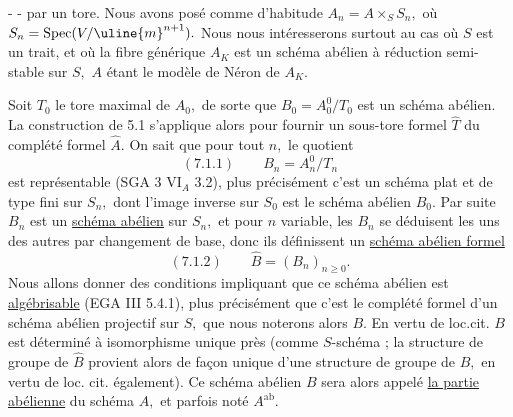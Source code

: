 -  -
par un tore. Nous avons posé comme d'habitude \(A_n=A\times_S S_n,\) où \(S_n=\operatorname{Spec}(V/\uline{m}^{n+1}).\) Nous nous intéresserons surtout au cas où \(S\) est un trait, et où la fibre générique \(A_K\) est un schéma abélien à réduction semi-stable sur \(S,\) \(A\) étant le modèle de Néron de \(A_K.\)

Soit \(T_0\) le tore maximal de \(A_0,\) de sorte que \(B_0=A_0^0/T_0\) est un schéma abélien. La construction de 5.1 s'applique alors pour fournir un sous-tore formel \(\hat T\) du complété formel \(\hat A.\) On sait que pour tout \(n,\) le quotient
\[
(7.1.1)\qquad B_n=A_n^0/T_n
\]
est représentable (SGA 3 VI\(_A\) 3.2), plus précisément c'est un schéma plat et de type fini sur \(S_n,\) dont l'image inverse sur \(S_0\) est le schéma abélien \(B_0.\) Par suite \(B_n\) est un \uline{schéma abélien} sur \(S_n,\) et pour \(n\) variable, les \(B_n\) se déduisent les uns des autres par changement de base, donc ils définissent un \uline{schéma abélien formel}
\[
(7.1.2)\qquad\hat B=(B_n)_{n\geq0}.
\]
Nous allons donner des conditions impliquant que ce schéma abélien est \uline{algébrisable} (EGA III 5.4.1), plus précisément que c'est le complété formel d'un schéma abélien projectif sur \(S,\) que nous noterons alors \(B.\) En vertu de loc.cit. \(B\) est déterminé à isomorphisme unique près (comme \(S\)-schéma ; la structure de groupe de \(\hat B\) provient alors de façon unique d'une structure de groupe de \(B,\) en vertu de loc. cit. également). Ce schéma abélien \(B\) sera alors appelé \uline{la partie abélienne} du schéma \(A,\) et parfois noté \(A^{\mathrm{ab}}.\)

